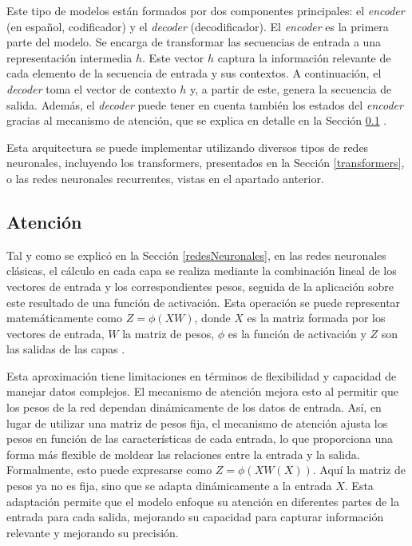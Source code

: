 \documentclass[11pt,spanish,listoffigures,listoftables]{tfgetsinf}
\begin{document}
Este tipo de modelos están formados por dos componentes principales: el \textit{encoder} (en español, codificador) y el \textit{decoder} (decodificador). El \textit{encoder} es la primera parte del modelo. Se encarga de transformar las secuencias de entrada a una representación intermedia $h$. Este vector $h$ captura la información relevante de cada elemento de la secuencia de entrada y sus contextos. A continuación, el \textit{decoder} toma el vector de contexto $h$ y, a partir de este, genera la secuencia de salida. Además, el \textit{decoder} puede tener en cuenta también los estados del \textit{encoder} gracias al mecanismo de atención, que se explica en detalle en la Sección \ref{atencion} \cite{sriram2017coldfusiontrainingseq2seq}.

Esta arquitectura se puede implementar utilizando diversos tipos de redes neuronales, incluyendo los transformers, presentados en la Sección \ref{transformers}, o las redes neuronales recurrentes, vistas en el apartado anterior.

\subsection{Atención} \label{atencion}

Tal y como se explicó en la Sección \ref{redesNeuronales}, en las redes neuronales clásicas, el cálculo en cada capa se realiza mediante la combinación lineal de los vectores de entrada y los correspondientes pesos, seguida de la aplicación sobre este resultado de una función de activación. Esta operación se puede representar matemáticamente como $Z = \phi(XW)$, donde $X$ es la matriz formada por los vectores de entrada, $W$ la matriz de pesos, $\phi$ es la función de activación y $Z$ son las salidas de las capas \cite{murphy2022probabilistic}. 

Esta aproximación tiene limitaciones en términos de flexibilidad y capacidad de manejar datos complejos. El mecanismo de atención mejora esto al permitir que los pesos de la red dependan dinámicamente de los datos de entrada. Así, en lugar de utilizar una matriz de pesos fija, el mecanismo de atención ajusta los pesos en función de las características de cada entrada, lo que proporciona una forma más flexible de moldear las relaciones entre la entrada y la salida. Formalmente, esto puede expresarse como $Z = \phi(XW(X))$. Aquí la matriz de pesos ya no es fija, sino que se adapta dinámicamente a la entrada $X$. Esta adaptación permite que el modelo enfoque su atención en diferentes partes de la entrada para cada salida, mejorando su capacidad para capturar información relevante y mejorando su precisión.
\end{document}

